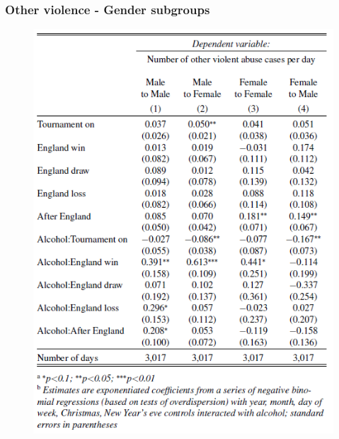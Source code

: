 \documentclass[hyperref={pdfpagelabels=false}]{beamer}
\begin{document}
\begin{frame}
\frametitle{Other violence - Gender subgroups}
\begin{center}
\begin{figure}
\includegraphics[scale=0.45]{append1.png}
\end{figure}
\end{center}
\end{frame}
\end{document}

